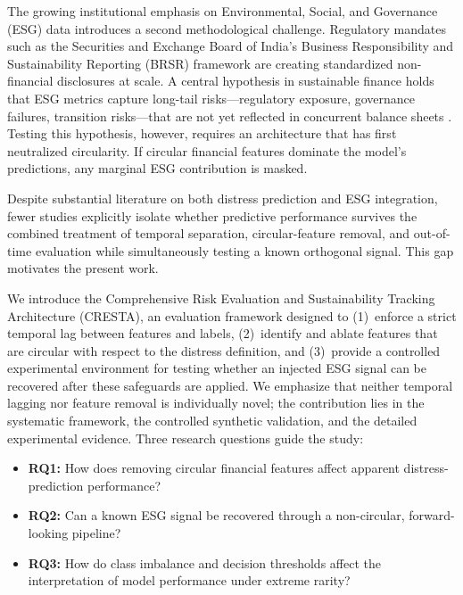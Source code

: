 \documentclass[sigconf,anonymous]{acmart}
\begin{document}
The growing institutional emphasis on Environmental, Social, and Governance (ESG) data introduces a second methodological challenge. Regulatory mandates such as the Securities and Exchange Board of India's Business Responsibility and Sustainability Reporting (BRSR) framework are creating standardized non-financial disclosures at scale. A central hypothesis in sustainable finance holds that ESG metrics capture long-tail risks---regulatory exposure, governance failures, transition risks---that are not yet reflected in concurrent balance sheets \cite{friede2015}. Testing this hypothesis, however, requires an architecture that has first neutralized circularity. If circular financial features dominate the model's predictions, any marginal ESG contribution is masked.

Despite substantial literature on both distress prediction and ESG integration, fewer studies explicitly isolate whether predictive performance survives the combined treatment of temporal separation, circular-feature removal, and out-of-time evaluation while simultaneously testing a known orthogonal signal. This gap motivates the present work.

We introduce the Comprehensive Risk Evaluation and Sustainability Tracking Architecture (CRESTA), an evaluation framework designed to (1)~enforce a strict temporal lag between features and labels, (2)~identify and ablate features that are circular with respect to the distress definition, and (3)~provide a controlled experimental environment for testing whether an injected ESG signal can be recovered after these safeguards are applied. We emphasize that neither temporal lagging nor feature removal is individually novel; the contribution lies in the systematic framework, the controlled synthetic validation, and the detailed experimental evidence. Three research questions guide the study:

\begin{itemize}
    \item \textbf{RQ1:} How does removing circular financial features affect apparent distress-prediction performance?
    \item \textbf{RQ2:} Can a known ESG signal be recovered through a non-circular, forward-looking pipeline?
    \item \textbf{RQ3:} How do class imbalance and decision thresholds affect the interpretation of model performance under extreme rarity?
\end{itemize}
\end{document}
